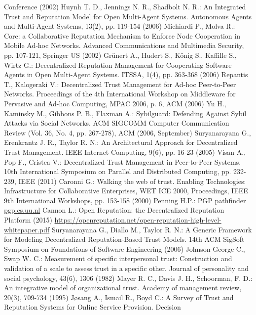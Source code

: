 \begin{thebibliography}{40}
  Conference (2002)
  Huynh T. D., Jennings N. R., Shadbolt N. R.: An Integrated Trust and Reputation Model for Open Multi-Agent Systems.
  Autonomous Agents and Multi-Agent Systems, 13(2), pp. 119-154 (2006)
  Michiardi P., Molva R.: Core: a Collaborative Reputation Mechanism to Enforce Node Cooperation in Mobile Ad-hoc
  Networks. Advanced Communications and Multimedia Security, pp. 107-121, Springer US (2002)
  Gr\"unert A., Hudert S., K\"onig S., Kaffille S., Wirtz G.: Decentralized Reputation Management for Cooperating Software
  Agents in Open Multi-Agent Systems. ITSSA, 1(4), pp. 363-368 (2006)
  Repantis T., Kalogeraki V.: Decentralized Trust Management for Ad-hoc Peer-to-Peer Networks. Proceedings of the 4th
  International Workshop on Middleware for Pervasive and Ad-hoc Computing, MPAC 2006, p. 6, ACM (2006)
  Yu H., Kaminsky M., Gibbons P. B., Flaxman A.: Sybilguard: Defending Against Sybil Attacks via Social Networks. ACM
  SIGCOMM Computer Communication Review (Vol. 36, No. 4, pp. 267-278), ACM (2006, September)
  Suryanarayana G., Erenkrantz J. R., Taylor R. N.: An Architectural Approach for Decentralized Trust Management. IEEE
  Internet Computing, 9(6), pp. 16-23 (2005)
  Visan A., Pop F., Cristea V.: Decentralized Trust Management in Peer-to-Peer Systems. 10th International Symposium on
  Parallel and Distributed Computing, pp. 232-239, IEEE (2011)
  Caronni G.: Walking the web of trust. Enabling Technologies: Infrastructure for Collaborative Enterprises, WET ICE 2000,
  Proceedings, IEEE 9th International Workshops, pp. 153-158 (2000)
  Penning H.P.: PGP pathfinder \url{pgp.cs.uu.nl}
  Cannon L.: Open Reputation: the Decentralized Reputation Platform (2015)
  \url{https://openreputation.net/open-reputation-high-level-whitepaper.pdf}
  Suryanarayana G., Diallo M., Taylor R. N.: A Generic Framework for Modeling Decentralized Reputation-Based Trust Models.
  14th ACM SigSoft Symposium on Foundations of Software Engineering (2006)
  Johnson-George C., Swap W. C.: Measurement of specific interpersonal trust: Construction and validation of a scale to
  assess trust in a specific other. Journal of personality and social psychology, 43(6), 1306 (1982)
  Mayer R. C., Davis J. H., Schoorman, F. D.: An integrative model of organizational trust. Academy of management review,
  20(3), 709-734 (1995)
  J\o{}sang A., Ismail R., Boyd C.: A Survey of Trust and Reputation Systems for Online Service Provision. Decision

\end{thebibliography}
